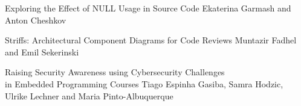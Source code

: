 \documentclass[12pt,twoside]{book}
\newcommand{\nospell}[1]{#1}
\begin{document}
  {\nospell{Exploring the Effect of NULL Usage in Source Code}}
  {\nospell{Ekaterina Garmash and Anton Cheshkov}}

  {\nospell{Striffs: Architectural Component Diagrams for Code Reviews}}
  {\nospell{Muntazir Fadhel and Emil Sekerinski}}

  {\nospell{Raising Security Awareness using Cybersecurity Challenges \\ in Embedded Programming Courses}}
  {\nospell{Tiago Espinha Gasiba, Samra Hodzic, \\ Ulrike Lechner and Maria Pinto-Albuquerque}}

\label{ref:index}
\printindex
\thispagestyle{empty}
\end{document}

